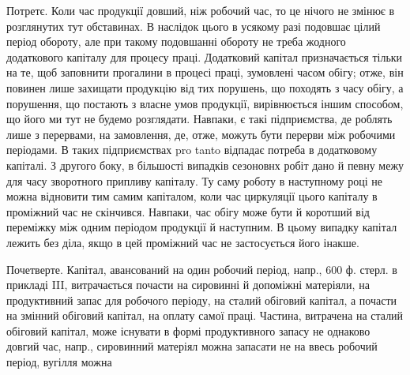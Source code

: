 Потретє. Коли час продукції довший, ніж робочий час, то це нічого
не змінює в розглянутих тут обставинах. В наслідок цього в усякому
разі подовшає цілий період обороту, але при такому подовшанні обороту
не треба жодного додаткового капіталу для процесу праці. Додатковий
капітал призначається тільки на те, щоб заповнити прогалини в процесі
праці, зумовлені часом обігу; отже, він повинен лише захищати
продукцію від тих порушень, що походять з часу обігу, а порушення,
що постають з власне умов продукції, вирівнюється іншим способом, що
його ми тут не будемо розглядати. Навпаки, є такі підприємства, де роблять
лише з перервами, на замовлення, де, отже, можуть бути перерви
між робочими періодами. В таких підприємствах pro tanto відпадає потреба
в додатковому капіталі. З другого боку, в більшості випадків сезоновнх
робіт дано й певну межу для часу зворотного припливу капіталу.
Ту саму роботу в наступному році не можна відновити тим самим капіталом,
коли час циркуляції цього капіталу в проміжний час не скінчився. Навпаки,
час обігу може бути й коротший від переміжку між одним періодом
продукції й наступним. В цьому випадку капітал лежить без діла,
якщо в цей проміжний час не застосується його інакше.

Почетверте. Капітал, авансований на один робочий період, напр.,
600 ф. стерл. в прикладі III, витрачається почасти на сировинні й допоміжні
матеріяли, на продуктивний запас для робочого періоду, на сталий обіговий
капітал, а почасти на змінний обіговий капітал, на оплату самої
праці. Частина, витрачена на сталий обіговий капітал, може існувати в
формі продуктивного запасу не однаково довгий час, напр., сировинний
матеріял можна запасати не на ввесь робочий період, вугілля можна
\parbreak{}  %
